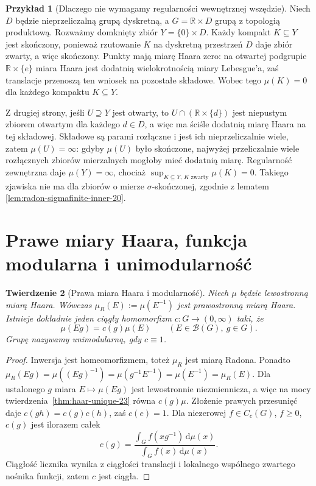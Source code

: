 \documentclass[11pt,a4paper,oneside]{book}
\numberwithin{equation}{chapter}
\theoremstyle{plain}
\newtheorem{twierdzenie}{Twierdzenie}[chapter]
\theoremstyle{definition}
\newtheorem{przyklad}[twierdzenie]{Przykład}
\theoremstyle{remark}
\begin{document}
\begin{przyklad}[Dlaczego nie wymagamy regularności wewnętrznej wszędzie]
\label{ex:haar-non-sigma-compact-23}
Niech $D$ będzie nieprzeliczalną grupą dyskretną,
a $G=\mathbb R\times D$ grupą z topologią produktową.
Rozważmy domknięty zbiór $Y=\{0\}\times D$.
Każdy kompakt $K\subseteq Y$ jest skończony, ponieważ
rzutowanie $K$ na dyskretną przestrzeń $D$ daje zbiór
zwarty, a więc skończony. Punkty mają miarę Haara zero:
na otwartej podgrupie $\mathbb R\times\{e\}$ miara Haara
jest dodatnią wielokrotnością miary Lebesgue'a, zaś
translacje przenoszą ten wniosek na pozostałe składowe.
Wobec tego $\mu(K)=0$ dla każdego kompaktu $K\subseteq Y$.

Z drugiej strony, jeśli $U\supseteq Y$ jest otwarty,
to $U\cap(\mathbb R\times\{d\})$ jest niepustym
zbiorem otwartym dla każdego $d\in D$, a więc ma
ściśle dodatnią miarę Haara na tej składowej.
Składowe są parami rozłączne i jest ich nieprzeliczalnie
wiele, zatem $\mu(U)=\infty$: gdyby $\mu(U)$ było
skończone, najwyżej przeliczalnie wiele rozłącznych
zbiorów mierzalnych mogłoby mieć dodatnią miarę.
Regularność zewnętrzna daje $\mu(Y)=\infty$, chociaż
$\sup_{K\subseteq Y,\,K\text{ zwarty}}\mu(K)=0$.
Takiego zjawiska nie ma dla zbiorów o mierze
$\sigma$-skończonej, zgodnie z lematem
\ref{lem:radon-sigmafinite-inner-20}.
\end{przyklad}

\section{Prawe miary Haara, funkcja modularna i unimodularność}
\begin{twierdzenie}[Prawa miara Haara i modularność]
\label{thm:haar-modular-23}
Niech $\mu$ będzie lewostronną miarą Haara.
Wówczas $\mu_R(E):=\mu(E^{-1})$ jest prawostronną
miarą Haara. Istnieje dokładnie jeden ciągły
homomorfizm $c:G\to(0,\infty)$ taki, że
\begin{equation}\label{eq:haar-modular-23}
 \mu(Eg)=c(g)\mu(E)\qquad(E\in\mathcal B(G),\ g\in G).
\end{equation}
Grupę nazywamy \emph{unimodularną}, gdy $c\equiv1$.
\end{twierdzenie}
\begin{proof}
Inwersja jest homeomorfizmem, toteż $\mu_R$ jest
miarą Radona. Ponadto
$\mu_R(Eg)=\mu((Eg)^{-1})=\mu(g^{-1}E^{-1})
=\mu(E^{-1})=\mu_R(E)$.
Dla ustalonego $g$ miara $E\mapsto\mu(Eg)$ jest
lewostronnie niezmiennicza, a więc na mocy
twierdzenia~\ref{thm:haar-unique-23} równa $c(g)\mu$.
Złożenie prawych przesunięć daje
$c(gh)=c(g)c(h)$, zaś $c(e)=1$.
Dla niezerowej $f\in C_c(G)$, $f\ge0$,
$c(g)$ jest ilorazem całek
\[
 c(g)=\frac{\int_G f(xg^{-1})\,\mathrm d\mu(x)}
 {\int_G f(x)\,\mathrm d\mu(x)}.
\]
Ciągłość licznika wynika z ciągłości translacji
i lokalnego wspólnego zwartego nośnika funkcji,
zatem $c$ jest ciągła.
\end{proof}
\end{document}
